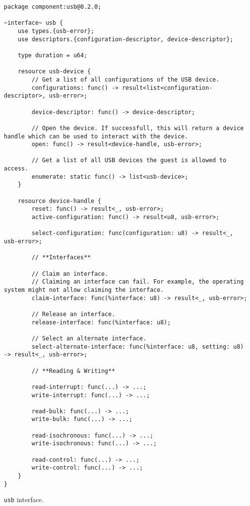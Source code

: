 \begin{code}
\begin{lstlisting}[breaklines, language=wit, tabsize=2]
package component:usb@0.2.0;

~interface~ usb {
	use types.{usb-error};
	use descriptors.{configuration-descriptor, device-descriptor};

	type duration = u64;

	resource usb-device {
		// Get a list of all configurations of the USB device.
		configurations: func() -> result<list<configuration-descriptor>, usb-error>;

		device-descriptor: func() -> device-descriptor;

		// Open the device. If successfull, this will return a device handle which can be used to interact with the device.
		open: func() -> result<device-handle, usb-error>;

		// Get a list of all USB devices the guest is allowed to access.
		enumerate: static func() -> list<usb-device>;
	}

	resource device-handle {
		reset: func() -> result<_, usb-error>;
		active-configuration: func() -> result<u8, usb-error>;

		select-configuration: func(configuration: u8) -> result<_, usb-error>;

		// **Interfaces**

		// Claim an interface.
		// Claiming an interface can fail. For example, the operating system might not allow claiming the interface.
		claim-interface: func(%interface: u8) -> result<_, usb-error>;

		// Release an interface.
		release-interface: func(%interface: u8);

		// Select an alternate interface.
		select-alternate-interface: func(%interface: u8, setting: u8) -> result<_, usb-error>;

		// **Reading & Writing**

		read-interrupt: func(...) -> ...;
		write-interrupt: func(...) -> ...;

		read-bulk: func(...) -> ...;
		write-bulk: func(...) -> ...;

		read-isochronous: func(...) -> ...;
		write-isochronous: func(...) -> ...;

		read-control: func(...) -> ...;
		write-control: func(...) -> ...;
	}
}
\end{lstlisting}
\caption{\texttt{usb} interface.}
\label{code:usb_interface}
\end{code}

